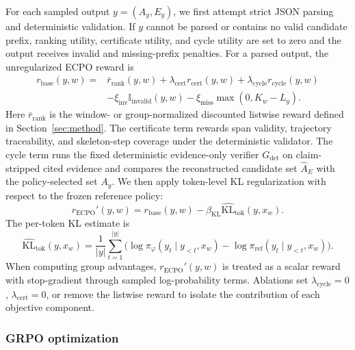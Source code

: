 \documentclass{article}
\newcommand{\Gdet}{G_{\mathrm{det}}}
\begin{document}
For each sampled output $y=(A_y,E_y)$, we first attempt strict JSON parsing and deterministic validation.
If $y$ cannot be parsed or contains no valid candidate prefix, ranking utility, certificate utility, and cycle utility are set to zero and the output receives invalid and missing-prefix penalties.
For a parsed output, the unregularized ECPO reward is
\begin{equation}
\begin{aligned}
r_{\mathrm{base}}(y,w)=&
\bar r_{\mathrm{rank}}(y,w)
+\lambda_{\mathrm{cert}}r_{\mathrm{cert}}(y,w)
+\lambda_{\mathrm{cycle}}r_{\mathrm{cycle}}(y,w)\\
&-\xi_{\mathrm{inv}}\mathbb{I}_{\mathrm{invalid}}(y,w)
-\xi_{\mathrm{miss}}\max(0,K_w-L_y).
\end{aligned}
\end{equation}
Here $\bar r_{\mathrm{rank}}$ is the window- or group-normalized discounted listwise reward defined in Section~\ref{sec:method}. The certificate term rewards span validity, trajectory traceability, and skeleton-step coverage under the deterministic validator. The cycle term runs the fixed deterministic evidence-only verifier $\Gdet$ on claim-stripped cited evidence and compares the reconstructed candidate set $\widehat{A}_E$ with the policy-selected set $A_y$.
We then apply token-level KL regularization with respect to the frozen reference policy:
\begin{equation}
r_{\mathrm{ECPO}}'(y,w)=
r_{\mathrm{base}}(y,w)
-\beta_{\mathrm{KL}}\widehat{\mathrm{KL}}_{\mathrm{tok}}(y,x_w).
\end{equation}
The per-token KL estimate is
\begin{equation}
\widehat{\mathrm{KL}}_{\mathrm{tok}}(y,x_w)
=
\frac{1}{|y|}
\sum_{t=1}^{|y|}
\Big(
\log \pi_\varphi(y_t\mid y_{<t},x_w)
-\log \pi_{\mathrm{ref}}(y_t\mid y_{<t},x_w)
\Big).
\end{equation}
When computing group advantages, $r_{\mathrm{ECPO}}'(y,w)$ is treated as a scalar reward with stop-gradient through sampled log-probability terms. Ablations set $\lambda_{\mathrm{cycle}}=0$, $\lambda_{\mathrm{cert}}=0$, or remove the listwise reward to isolate the contribution of each objective component.

\subsubsection{GRPO optimization}
\label{sec:app_rl_ppo}
\end{document}
